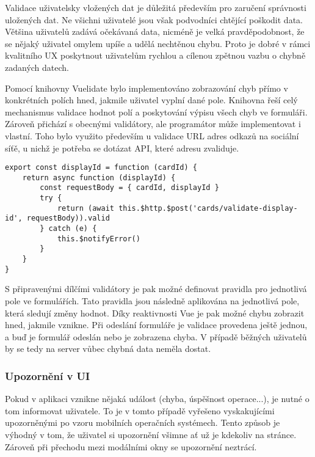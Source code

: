 		Validace uživatelsky vložených dat je důležitá především pro zaručení správnosti uložených dat.
		Ne všichni uživatelé jsou však podvodníci chtějící poškodit data.
		Většina uživatelů zadává očekávaná data, nicméně je velká pravděpodobnost, že se nějaký uživatel omylem upíše
		a udělá nechtěnou chybu.
		Proto je dobré v rámci kvalitního \ac{UX} poskytnout uživatelům rychlou a cílenou zpětnou vazbu o chybně zadaných
		datech.


		Pomocí knihovny Vuelidate bylo implementováno zobrazování chyb přímo v konkrétních polích hned,
		jakmile uživatel vyplní dané pole.
		Knihovna řeší celý mechanismus validace hodnot polí a poskytování výpisu všech chyb ve formuláři.
		Zároveň přichází s obecnými validátory, ale programátor může implementovat i vlastní.
		Toho bylo využito především u validace \ac{URL} adres odkazů na sociální síťě, u nichž je potřeba se dotázat \ac{API},
		které adresu zvaliduje.

		\begin{lstlisting}[caption={Ukázka implementace vlastního validátoru využívající API k validaci hodnoty. Zdroj: [autor]}]
export const displayId = function (cardId) {
	return async function (displayId) {
		const requestBody = { cardId, displayId }
		try {
	  		return (await this.$http.$post('cards/validate-display-id', requestBody)).valid
		} catch (e) {
		    this.$notifyError()
		}
	}
}
		\end{lstlisting}

		S připravenými dílčími validátory je pak možné definovat pravidla pro jednotlivá pole ve formulářích.
		Tato pravidla jsou následně aplikována na jednotlivá pole, která sledují změny hodnot.
		Díky reaktivnosti Vue je pak možné chybu zobrazit hned, jakmile vznikne.
		Při odeslání formuláře je validace provedena ještě jednou, a buď je formulář odeslán nebo je
		zobrazena chyba.
		V případě běžných uživatelů by se tedy na server vůbec chybná data neměla dostat.

		\subsubsection{Upozornění v UI}

		Pokud v aplikaci vznikne nějaká událost (chyba, úspěšnost operace...), je nutné o tom informovat uživatele.
		To je v tomto případě vyřešeno vyskakujícími upozorněnými po vzoru mobilních operačních
		systémech.
		Tento způsob je výhodný v tom, že uživatel si upozornění všimne ať už je kdekoliv na stránce.
		Zároveň při přechodu mezi modálními okny se upozornění neztrácí.

